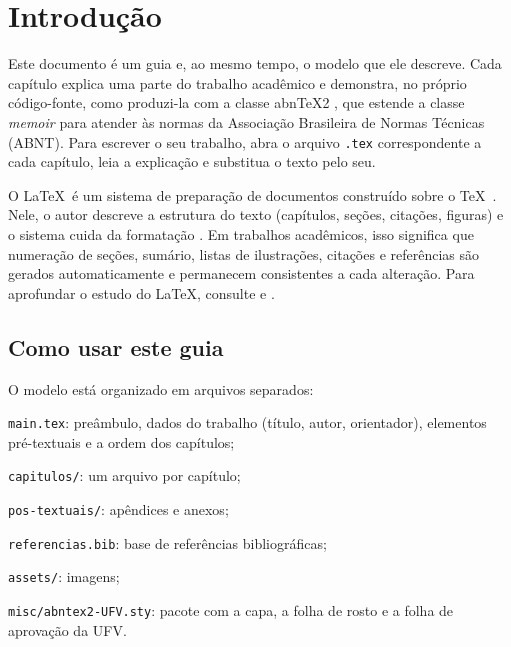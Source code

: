 \documentclass[
	12pt, %
	openright, %
	oneside, %
	a4paper, %
	sumario=tradicional, %
	english, %
	brazil, %
]{abntex2}
\begin{document}
\tableofcontents*
\cleardoublepage


\textual

\chapter{Introdução}\label{cap:introducao}

Este documento é um guia e, ao mesmo tempo, o modelo que ele descreve. Cada capítulo explica uma parte do trabalho acadêmico e demonstra, no próprio código-fonte, como produzi-la com a classe abn\TeX2 \cite{abntex2classe}, que estende a classe \textit{memoir} \cite{memoir} para atender às normas da Associação Brasileira de Normas Técnicas (ABNT). Para escrever o seu trabalho, abra o arquivo \texttt{.tex} correspondente a cada capítulo, leia a explicação e substitua o texto pelo seu.

O \LaTeX\ é um sistema de preparação de documentos construído sobre o \TeX\ \cite{knuth1984texbook}. Nele, o autor descreve a estrutura do texto (capítulos, seções, citações, figuras) e o sistema cuida da formatação \cite{lamport1994}. Em trabalhos acadêmicos, isso significa que numeração de seções, sumário, listas de ilustrações, citações e referências são gerados automaticamente e permanecem consistentes a cada alteração. Para aprofundar o estudo do \LaTeX, consulte  e .

\section{Como usar este guia}\label{sec:como-usar}

O modelo está organizado em arquivos separados:

\begin{alineas}
	\item \texttt{main.tex}: preâmbulo, dados do trabalho (título, autor, orientador), elementos pré-textuais e a ordem dos capítulos;
	\item \texttt{capitulos/}: um arquivo por capítulo;
	\item \texttt{pos-textuais/}: apêndices e anexos;
	\item \texttt{referencias.bib}: base de referências bibliográficas;
	\item \texttt{assets/}: imagens;
	\item \texttt{misc/abntex2-UFV.sty}: pacote com a capa, a folha de rosto e a folha de aprovação da UFV.
\end{alineas}
\end{document}

